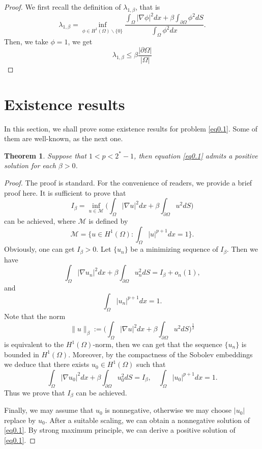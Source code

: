\documentclass[12pt,reqno]{amsart}
\numberwithin{equation}{section}
\newtheorem{theorem}{Theorem}[section]
\theoremstyle{definition}
\begin{document}
\begin{proof}
We first  recall the definition of $\lambda_{1,\beta}$, that is
$$
\lambda_{1,\beta}=\inf_{\phi\in H^1(\Omega)\backslash\{0\}}\frac{\int_{\Omega}|\nabla \phi|^2dx+\beta\int_{\partial\Omega}\phi^2dS}{\int_{\Omega}\phi^2dx}.
$$
Then, we take $\phi=1$, we get 
$$
 \lambda_{1,\beta}\leq\beta\frac{|\partial\Omega|}{|\Omega|}
$$
\end{proof}








\section{Existence results}
In this section, we shall prove some existence results for problem \eqref{eq0.1}. Some of them are well-known, as the next one.
\begin{theorem}
Suppose that $1<p<2^*-1$, then equation \eqref{eq0.1} admits a positive  solution for each $\beta>0$.
\end{theorem}

\begin{proof}
The proof is standard. For the convenience of readers, we provide a brief proof here. It is sufficient to prove that 
$$
I_\beta=\inf_{u\in \mathcal{M}}\Big(\int_{\Omega} |\nabla u|^2dx+\beta\int_{\partial\Omega}u^2dS\Big)
$$
can be achieved, where $\mathcal{M}$ is defined by 
$$
\mathcal{M}=\Big\{ u\in H^1(\Omega) : \int_{\Omega}|u|^{p+1}dx=1\Big\}.
$$
Obviously, one can get $I_\beta>0$. Let $\{u_n\}$ be a minimizing sequence of $I_\beta$. Then we have 
$$
\int_{\Omega} |\nabla u_n|^2dx+\beta\int_{\partial\Omega}u_n^2dS=I_\beta+o_n(1),
$$
and
$$
\int_{\Omega}|u_n|^{p+1}dx=1.
$$
Note that the norm 
$$
\|u\|_\beta:=\Big(\int_{\Omega} |\nabla u|^2dx+\beta\int_{\partial\Omega}u^2dS\Big)^{\frac{1}{2}}
$$
is equivalent  to the $H^1(\Omega)$-norm, then we can get that  the sequence $\{u_n\}$ is bounded in $H^1(\Omega)$. Moreover, by the compactness of the Sobolev embeddings we deduce that there exists $u_0\in H^1(\Omega)$ such that  
$$
\int_{\Omega} |\nabla u_0|^2dx+\beta\int_{\partial\Omega}u_0^2dS=I_\beta,\quad \int_{\Omega}|u_0|^{p+1}dx=1.
$$
Thus we prove that $I_\beta$ can be achieved. 

Finally, we may assume that $u_0$ is nonnegative, otherwise we may choose $|u_0|$ replace by $u_0$.  After a suitable scaling, we can obtain a nonnegative solution of \eqref{eq0.1}. By strong maximum principle, we can derive a positive solution  of \eqref{eq0.1}.
\end{proof}
\end{document}

